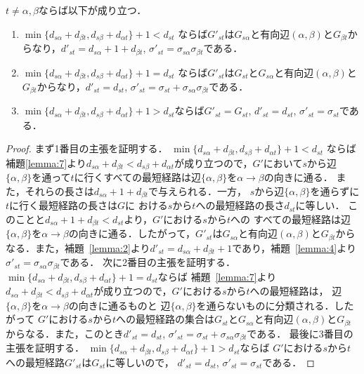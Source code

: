 \begin{lemma}
\rm 
$t \neq \alpha, \beta$ならば以下が成り立つ．
\begin{enumerate}
\item $\min\{d_{s\alpha}+d_{\beta t}, d_{s\beta}+d_{\alpha t}\}+1<d_{st}$
ならば$G'_{st}$は$G_{s\alpha}$と有向辺$(\alpha,\beta)$と$G_{\beta t}$からなり，$d'_{st}=d_{s\alpha}+1+d_{\beta t}$, $\sigma'_{st}=\sigma_{s\alpha}\sigma_{\beta t}$である．
\item $\min\{d_{s\alpha}+d_{\beta t}, d_{s\beta}+d_{\alpha t}\}+1=d_{st}$
ならば$G'_{st}$は$G_{st}$と$G_{s\alpha}$と有向辺$(\alpha,\beta)$と$G_{\beta t}$からなり，$d'_{st}=d_{st}$, $\sigma'_{st}=\sigma_{st}+\sigma_{s\alpha}\sigma_{\beta t}$である．
\item $\min\{d_{s\alpha}+d_{\beta t}, d_{s\beta}+d_{\alpha t}\}+1>d_{st}$ならば$G'_{st}=G_{st}$, $d'_{st}=d_{st}$, $\sigma'_{st}=\sigma_{st}$である．
\end{enumerate}
\label{lemma:8}
\end{lemma}
\begin{proof}
まず1番目の主張を証明する．
$\min\{d_{s\alpha}+d_{\beta t}, d_{s\beta}+d_{\alpha t}\}+1<d_{st}$
ならば補題\ref{lemma:7}より$d_{s\alpha}+d_{\beta t}<d_{s\beta}+d_{\alpha t}$が成り立つので，$G'$において$s$から辺$\{\alpha,\beta\}$を通って$t$に行くすべての最短経路は辺$\{\alpha,\beta\}$を$\alpha \rightarrow \beta$の向きに通る．
また，それらの長さは$d_{s\alpha}+1+d_{\beta t}$で与えられる．一方，
$s$から辺$\{\alpha,\beta\}$を通らずに$t$に行く最短経路の長さは$G$に
おける$s$から$t$への最短経路の長さ$d_{st}$に等しい．
このことと$d_{s\alpha}+1+d_{\beta t}<d_{st}$より，$G'$における$s$から$t$への
すべての最短経路は辺$\{\alpha,\beta\}$を$\alpha \rightarrow \beta$の向きに通る．したがって，$G'_{st}$は$G_{s\alpha}$と有向辺$(\alpha,\beta)$と$G_{\beta t}$からなる．また，補題~\ref{lemma:2}より$d'_{st}=d_{s\alpha}+d_{\beta t}+1$であり，補題~\ref{lemma:4}より$\sigma'_{st}=\sigma_{s\alpha}\sigma_{\beta t}$である．
%
次に2番目の主張を証明する．
$\min\{d_{s\alpha}+d_{\beta t}, d_{s\beta}+d_{\alpha t}\}+1=d_{st}$ならば
補題~\ref{lemma:7}より$d_{s\alpha}+d_{\beta t}<d_{s\beta}+d_{\alpha t}$が成り立つので，$G'$における$s$から$t$への最短経路は，
辺$\{\alpha,\beta\}$を$\alpha \rightarrow \beta$の向きに通るものと
辺$\{\alpha,\beta\}$を通らないものに分類される．したがって
$G'$における$s$から$t$への最短経路の集合は$G_{st}$と$G_{s\alpha}$と有向辺$(\alpha,\beta)$と$G_{\beta t}$からなる．また，このとき$d'_{st}=d_{st}$, $\sigma'_{st}=\sigma_{st}+\sigma_{s\alpha}\sigma_{\beta t}$である．
%
最後に3番目の主張を証明する．
$\min\{d_{s\alpha}+d_{\beta t}, d_{s\beta}+d_{\alpha t}\}+1>d_{st}$ならば
$G'$における$s$から$t$への最短経路$G'_{st}$は$G_{st}$に等しいので，
$d'_{st}=d_{st}$, $\sigma'_{st}=\sigma_{st}$である．
\end{proof}

